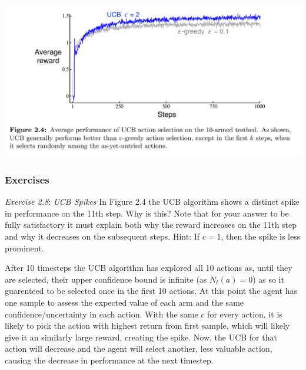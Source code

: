 \includegraphics[scale=0.3]{./UCB_graph.png}

\subsubsection{Exercises}
\textit{Exercise 2.8}: \textit{UCB Spikes} In Figure 2.4 the UCB algorithm shows a distinct spike
in performance on the 11th step. Why is this? Note that for your answer to be fully
satisfactory it must explain both why the reward increases on the 11th step and why it
decreases on the subsequent steps. Hint: If \(c = 1\), then the spike is less prominent. 

After 10 timesteps the UCB algorithm has explored all 10 actions as, until they are selected,
their upper confidence bound is infinite (as \(N_t(a) = 0\)) as so it guarenteed to be selected once in
the first 10 actions. At this point the agent has one sample to assess the expected value of each
arm and the same confidence/uncertainty in each action. With the same \(c\) for every action, it is likely to pick the action
with highest return from first sample, which will likely give it an similarly large reward, creating
the spike. Now, the UCB for that action will decrease and the agent will
select another, less valuable action, causing the decrease in performance at the next timestep.




